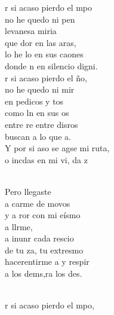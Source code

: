 \documentclass[12pt]{article}
\begin{document}
\begin{multicols*}{2}
\begin{cancion}%
	r si acaso pierdo el mpo \\
	no he quedo ni pen \\
	levanesa miria \\
	que dor en las aras, \\
	lo he lo en sus caones \\
	donde n en silencio digni. \\
\jump
	r si acaso pierdo el ño, \\
	no he quedo ni mir\\
	en pedicos y tos\\
	como ln en sus os \\
	entre re entre disros\\
	buscan  a lo que a. \\
\jump
	Y por si aso se agse mi ruta,\\
	o incdas en mi vi, da z\\\jump\\
	\begin{chorus}%
	Pero llegaste   \\
	a carme de movos\\
	y a ror con mi eísmo\\
	a llrme, \\
	a inunr cada rescio\\
	de tu za, tu extresmo \\
	hacerentirme a y respir \\
	a los dems,ra los des. \\
	\end{chorus}%
	\jump\\
	r si acaso pierdo el mpo, \\

\end{cancion}
\end{multicols*}
\end{document}
